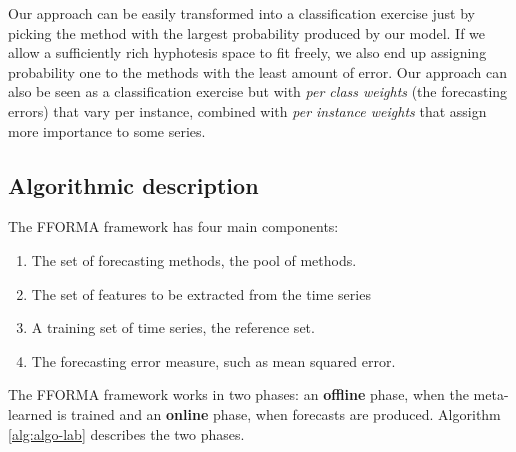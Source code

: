 \documentclass[11pt,a4paper,]{article}
\providecommand{\tightlist}{%
  \setlength{\itemsep}{0pt}\setlength{\parskip}{0pt}}
\theoremstyle{definition}
\theoremstyle{definition}
\theoremstyle{definition}
\theoremstyle{remark}
\begin{document}
Our approach can be easily transformed into a classification exercise
just by picking the method with the largest probability produced by our
model. If we allow a sufficiently rich hyphotesis space to fit freely,
we also end up assigning probability one to the methods with the least
amount of error. Our approach can also be seen as a classification
exercise but with \emph{per class weights} (the forecasting errors) that
vary per instance, combined with \emph{per instance weights} that assign
more importance to some series.

\subsection{Algorithmic description}\label{algorithmic-description}

The FFORMA framework has four main components:

\begin{enumerate}
\def\labelenumi{\arabic{enumi}.}
\tightlist
\item
  The set of forecasting methods, the pool of methods.
\item
  The set of features to be extracted from the time series
\item
  A training set of time series, the reference set.
\item
  The forecasting error measure, such as mean squared error.
\end{enumerate}

The FFORMA framework works in two phases: an \textbf{offline} phase,
when the meta-learned is trained and an \textbf{online} phase, when
forecasts are produced. Algorithm \ref{alg:algo-lab} describes the two
phases.
\end{document}
